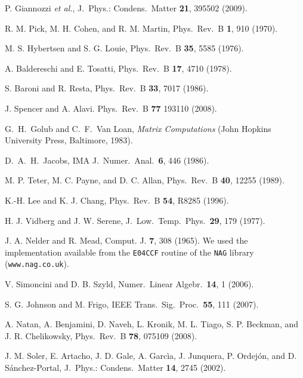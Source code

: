 \documentclass[twocolumn,prb,showpacs,superscriptaddress]{revtex4}
\begin{document}
\begin{thebibliography}{99}
P. Giannozzi {\it et al.},
J.\ Phys.: Condens.\ Matter {\bf 21}, 395502 (2009).

R. M. Pick, M. H. Cohen, and R. M. Martin,
Phys.\ Rev.\ B {\bf 1}, 910 (1970). 

M. S. Hybertsen and S. G. Louie,
Phys.\ Rev.\ B {\bf 35}, 5585 (1976).

A. Baldereschi and E. Tosatti,
Phys.\ Rev.\ B {\bf 17}, 4710 (1978).

S. Baroni and R. Resta,
Phys.\ Rev.\ B {\bf 33}, 7017 (1986).

J. Spencer and A. Alavi.
Phys.\ Rev.\ B {\bf 77} 193110 (2008).

G.\ H.\ Golub and C.\ F.\ Van Loan, {\it Matrix Computations} (John Hopkins University Press, Baltimore, 1983).

D.\ A.\ H.\ Jacobs,
IMA J.\ Numer.\ Anal.\ {\bf 6}, 446 (1986).

M. P. Teter, M. C. Payne, and D. C. Allan,
Phys.\ Rev.\ B {\bf 40}, 12255 (1989).

K.-H. Lee and K. J. Chang,
Phys.\ Rev.\ B {\bf 54}, R8285 (1996).

H. J. Vidberg and J. W. Serene,
J.\ Low.\ Temp.\ Phys.\ {\bf 29}, 179 (1977).

J. A. Nelder and R. Mead,
Comput. J. {\bf 7}, 308 (1965).
We used the implementation available from the
{\tt E04CCF} routine of the {\tt NAG} library
({\tt www.nag.co.uk}).

V. Simoncini and D. B. Szyld,
Numer.\ Linear Algebr.\ {\bf 14}, 1 (2006).

S. G. Johnson and M. Frigo,
IEEE Trans.\ Sig.\ Proc.\ {\bf 55}, 111 (2007).

A. Natan, A. Benjamini, D. Naveh, L. Kronik, M. L. Tiago, S. P. Beckman, and J. R. Chelikowsky,
Phys.\ Rev.\ B {\bf 78}, 075109 (2008).

J. M. Soler, E. Artacho, J. D. Gale, A. Garc\`ia, J. Junquera, P. Ordej\'on, and D. S\'anchez-Portal,
J.\ Phys.: Condens.\ Matter {\bf 14}, 2745 (2002).

\end{thebibliography}
\end{document}
